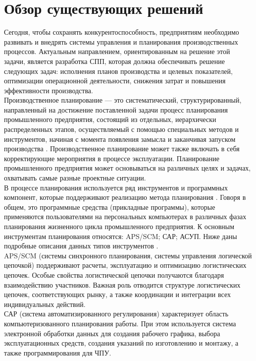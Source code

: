 \section{Обзор существующих решений}
\indent Сегодня, чтобы сохранять конкурентоспособность, предприятиям необходимо развивать и внедрять системы управления и планирования производственных процессов. 
Актуальным направлением, ориентированным на решение этой задачи, является разработка СПП, которая должна обеспечивать решение следующих задач: исполнения планов производства и целевых показателей, оптимизации операционной деятельности, снижения затрат и повышения эффективности производства.\\
\indent Производственное планирование — это систематический, структурированный, направленный на достижение поставленной задачи процесс планирования промышленного предприятия, состоящий из отдельных, иерархически распределенных этапов, осуществляемый с помощью специальных методов и инструментов, начиная с момента появления замысла и заканчивая запуском производства \cite{mulBook}.
Производственное планирование может также включать в себя корректирующие мероприятия в процессе эксплуатации. Планирование промышленного предприятия может основываться на различных целях и задачах, охватывать самые разные проектные ситуации.\\
\indent В процессе планирования используется ряд инструментов и программных компонент, которые поддерживают реализацию метода планирования \cite{lodonBook}.
Говоря в общем, это программные средства (прикладные программы), которые применяются пользователями на персональных компьютерах в различных фазах планирования жизненного цикла промышленного предприятия.
К основным инструментам планирования относятся: APS/SCM; САР; АСУП. 
Ниже даны подробные описания данных типов инструментов \cite{oliriBook}.\\
\indent APS/SCM (системы синхронного планирования, системы управления логической цепочкой) поддерживают расчеты, эксплуатацию и оптимизацию логистических цепочек. 
Особые свойства логистической цепочки получаются благодаря взаимодействию участников. 
Важная роль отводится структуре логистических цепочек, соответствующих рынку, а также координации и интеграции всех индивидуальных действий.\\
\indent САР (система автоматизированного регулирования) характеризует область компьютеризованного планирования работы. 
При этом используется система электронной обработки данных для создания рабочего графика, выбора эксплуатационных средств, создания указаний по изготовлению и монтажу, а также программирования для ЧПУ.\\
